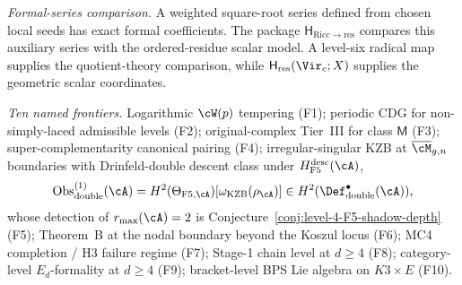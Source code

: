 \emph{Formal-series comparison.}  A weighted square-root series
defined from chosen local seeds has exact formal coefficients.  The
package $\mathsf H_{\mathrm{Ricc}\to\mathrm{res}}$ compares this
auxiliary series with the ordered-residue scalar model.  A level-six
radical map supplies the quotient-theory comparison, while
$\mathsf H_{\mathrm{res}}(\Vir_c;X)$ supplies the geometric scalar
coordinates.

\emph{Ten named frontiers.} Logarithmic $\cW(p)$ tempering (F1);
periodic CDG for non-simply-laced admissible levels (F2);
original-complex Tier~III for class $\mathsf M$ (F3);
super-complementarity canonical pairing (F4); irregular-singular KZB
at $\overline{\cM}_{g,n}$ boundaries with Drinfeld-double
descent class under $H_{\mathrm{F5}}^{\mathrm{desc}}(\cA)$,
\[
 \operatorname{Obs}^{(1)}_{\mathrm{double}}(\cA)
 =H^2(\Theta_{\mathrm{F5},\cA})
  [\omega_{\mathrm{KZB}}(\rho_\cA)]
 \in H^2(\Def_{\mathrm{double}}^\bullet(\cA)),
\]
whose detection of $r_{\max}(\cA)=2$ is
Conjecture~\ref{conj:level-4-F5-shadow-depth} (F5); Theorem~B at the nodal boundary
beyond the Koszul locus (F6); MC4 completion / H3 failure regime
(F7); Stage-1 chain level at $d\ge 4$ (F8); category-level
$E_d$-formality at $d\ge 4$ (F9); bracket-level BPS Lie algebra on
$K3\times E$ (F10).

